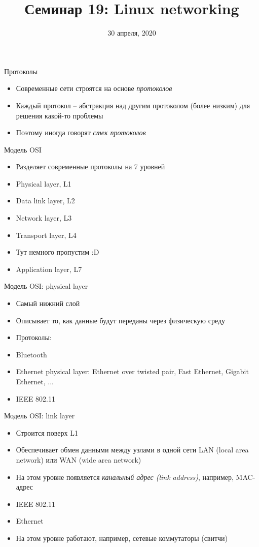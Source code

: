 \documentclass[10pt,pdf,hyperref={unicode}]{beamer}
\title{Семинар 19: Linux networking}
\date{30 апреля, 2020}
\begin{document}
\begin{frame}
  \titlepage
\end{frame}

\begin{frame}{Протоколы}
\begin{itemize}
    \item Современные сети строятся на основе \emph{протоколов}
    \item Каждый протокол -- абстракция над другим протоколом (более низким) для решения какой-то проблемы
    \item Поэтому иногда говорят \emph{стек протоколов}
\end{itemize}
\end{frame}


\begin{frame}{Модель OSI}
\begin{itemize}
    \item Разделяет современные протоколы на 7 уровней
    \item Physical layer, L1
    \item Data link layer, L2
    \item Network layer, L3
    \item Transport layer, L4
    \item Тут немного пропустим :D
    \item Application layer, L7
\end{itemize}
\end{frame}


\begin{frame}{Модель OSI: physical layer}
\begin{itemize}
    \item Самый нижний слой
    \item Описывает то, как данные будут переданы через физическую среду
    \item Протоколы:
    \item Bluetooth
    \item Ethernet physical layer: Ethernet over twisted pair, Fast Ethernet, Gigabit Ethernet, ...
    \item IEEE 802.11
\end{itemize}
\end{frame}

\begin{frame}{Модель OSI: link layer}
\begin{itemize}
    \item Строится поверх L1
    \item Обеспечивает обмен данными между узлами в одной сети LAN (local area network) или WAN (wide area network)
    \item На этом уровне появляется \emph{канальный адрес (link address)}, например, MAC-адрес
    \item IEEE 802.11
    \item Ethernet
    \item На этом уровне работают, например, сетевые коммутаторы (свитчи)
\end{itemize}
\end{frame}
\end{document}
